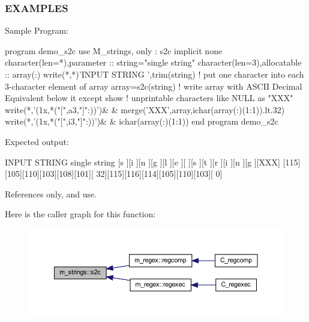 \subsubsection*{E\+X\+A\+M\+P\+L\+ES}

\begin{DoxyVerb}Sample Program:

 program demo_s2c
 use M_strings, only : s2c
 implicit none
 character(len=*),parameter   :: string="single string"
 character(len=3),allocatable :: array(:)
    write(*,*)'INPUT STRING ',trim(string)
    ! put one character into each 3-character element of array
    array=s2c(string)
    ! write array with ASCII Decimal Equivalent below it except show
    ! unprintable characters like NULL as "XXX"
    write(*,'(1x,*("[",a3,"]":))')&
         & merge('XXX',array,ichar(array(:)(1:1)).lt.32)
    write(*,'(1x,*("[",i3,"]":))')&
         & ichar(array(:)(1:1))
 end program demo_s2c
\end{DoxyVerb}


Expected output\+:

I\+N\+P\+UT S\+T\+R\+I\+NG single string \mbox{[}s \mbox{]}\mbox{[}i \mbox{]}\mbox{[}n \mbox{]}\mbox{[}g \mbox{]}\mbox{[}l \mbox{]}\mbox{[}e \mbox{]}\mbox{[} \mbox{]}\mbox{[}s \mbox{]}\mbox{[}t \mbox{]}\mbox{[}r \mbox{]}\mbox{[}i \mbox{]}\mbox{[}n \mbox{]}\mbox{[}g \mbox{]}\mbox{[}X\+XX\mbox{]} \mbox{[}115\mbox{]}\mbox{[}105\mbox{]}\mbox{[}110\mbox{]}\mbox{[}103\mbox{]}\mbox{[}108\mbox{]}\mbox{[}101\mbox{]}\mbox{[} 32\mbox{]}\mbox{[}115\mbox{]}\mbox{[}116\mbox{]}\mbox{[}114\mbox{]}\mbox{[}105\mbox{]}\mbox{[}110\mbox{]}\mbox{[}103\mbox{]}\mbox{[} 0\mbox{]} 

References only, and use.

Here is the caller graph for this function\+:
\nopagebreak
\begin{figure}[H]
\begin{center}
\leavevmode
\includegraphics[width=350pt]{namespacem__strings_a9a3d38d8e7c4212d63487b9b46bec3b7_icgraph}
\end{center}
\end{figure}
\mbox{\label{namespacem__strings_a7b153720f1f9b93c49094dcb1272995b}} 

